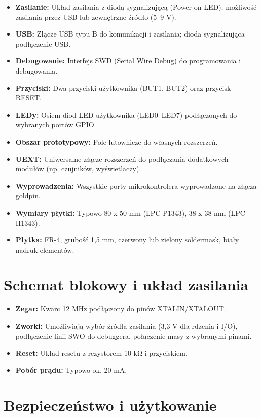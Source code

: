 \documentclass[a4paper,12pt]{report}
\begin{document}
\begin{itemize}
    \item \textbf{Zasilanie:} Układ zasilania z diodą sygnalizującą (Power-on LED); możliwość zasilania przez USB lub zewnętrzne źródło (5--9 V).
    \item \textbf{USB:} Złącze USB typu B do komunikacji i zasilania; dioda sygnalizująca podłączenie USB.
    \item \textbf{Debugowanie:} Interfejs SWD (Serial Wire Debug) do programowania i debugowania.
    \item \textbf{Przyciski:} Dwa przyciski użytkownika (BUT1, BUT2) oraz przycisk RESET.
    \item \textbf{LEDy:} Osiem diod LED użytkownika (LED0--LED7) podłączonych do wybranych portów GPIO.
    \item \textbf{Obszar prototypowy:} Pole lutownicze do własnych rozszerzeń.
    \item \textbf{UEXT:} Uniwersalne złącze rozszerzeń do podłączania dodatkowych modułów (np. czujników, wyświetlaczy).
    \item \textbf{Wyprowadzenia:} Wszystkie porty mikrokontrolera wyprowadzone na złącza goldpin.
    \item \textbf{Wymiary płytki:} Typowo 80 x 50 mm (LPC-P1343), 38 x 38 mm (LPC-H1343).
    \item \textbf{Płytka:} FR-4, grubość 1,5 mm, czerwony lub zielony soldermask, biały nadruk elementów.
\end{itemize}

\section{Schemat blokowy i układ zasilania}

\begin{itemize}
    \item \textbf{Zegar:} Kwarc 12 MHz podłączony do pinów XTALIN/XTALOUT.
    \item \textbf{Zworki:} Umożliwiają wybór źródła zasilania (3,3 V dla rdzenia i I/O), podłączenie linii SWO do debuggera, połączenie masy z wybranymi pinami.
    \item \textbf{Reset:} Układ resetu z rezystorem 10 k\si{\ohm} i przyciskiem.
    \item \textbf{Pobór prądu:} Typowo ok. 20 mA.
\end{itemize}

\section{Bezpieczeństwo i użytkowanie}
\end{document}
